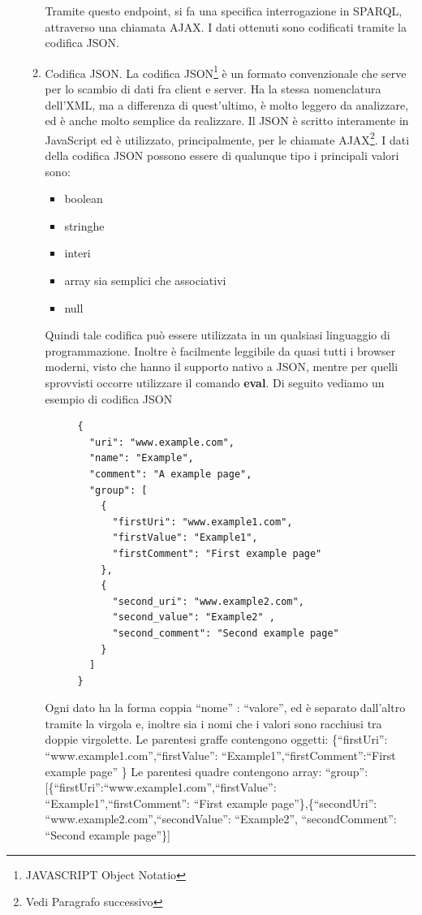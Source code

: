 \documentclass[a4paper,11pt]{article}
\begin{document}
\begin{enumerate}
\begin{enumerate}[label*=\arabic*.]
Tramite questo endpoint, si fa una specifica interrogazione in SPARQL, attraverso una chiamata AJAX. I dati ottenuti sono codificati tramite la codifica JSON.
			
			\item Codifica JSON.\newline
La codifica JSON\footnote{JAVASCRIPT Object Notatio} è un formato convenzionale che serve per lo scambio di dati fra client e server. Ha la stessa nomenclatura dell'XML, ma  a differenza di quest'ultimo, è molto leggero da analizzare, ed è anche molto semplice da realizzare.
Il JSON è scritto interamente in JavaScript ed è  utilizzato, principalmente, per le chiamate AJAX\footnote{Vedi Paragrafo successivo}. I dati della codifica JSON possono essere di qualunque tipo i principali valori sono:
\begin{itemize}
	\item boolean
	\item stringhe
	\item interi 
	\item array sia semplici che associativi
	\item null
\end{itemize} 
Quindi tale codifica può essere utilizzata in un qualsiasi linguaggio di programmazione.
Inoltre è facilmente leggibile da quasi tutti i browser moderni, visto che hanno il supporto nativo a JSON, mentre per quelli sprovvisti occorre utilizzare il comando \textbf{eval}. \newline Di seguito vediamo un esempio di codifica JSON
	\begin{figure}[htb]
		\centering
		\begin{lstlisting}[language=HTML, basicstyle=\large]
{
  "uri": "www.example.com",
  "name": "Example",
  "comment": "A example page",
  "group": [
    {
      "firstUri": "www.example1.com",
      "firstValue": "Example1",
      "firstComment": "First example page"       
    },   
    {
      "second_uri": "www.example2.com",
      "second_value": "Example2" ,
      "second_comment": "Second example page"
    }
  ]
}
		\end{lstlisting}
 \end{figure}\newline
Ogni dato ha la forma coppia ``nome'' : ``valore'', ed è separato dall'altro tramite la virgola e, inoltre sia i nomi che i valori sono racchiusi tra doppie virgolette.\newpage
Le parentesi graffe contengono oggetti: \newline \{``firstUri'': ``www.example1.com'',``firstValue'': ``Example1'',\newline ``firstComment'':``First example page''   \} \newline
Le parentesi quadre contengono array: \newline ``group'': [\{``firstUri'':``www.example1.com'',``firstValue'': ``Example1'',\newline ``firstComment'': ``First example page''\},\newline\{``secondUri'': ``www.example2.com'',``secondValue'': ``Example2'', \newline ``secondComment'': ``Second example page''\}]


\end{enumerate}
\end{enumerate}
\end{document}
